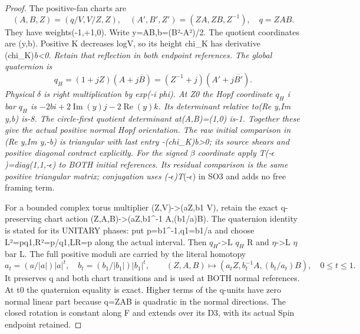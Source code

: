 \begin{proof}
The positive-fan charts are
\[
(A,B,Z)=(q/V,V/Z,Z),\quad(A',B',Z')=(ZA,ZB,Z^{-1}),\quad q=ZAB.
\]
They have weights(-1,+1,0). Write y=AB,b=(\textbar B\textbar²-\textbar A\textbar²)/2. The
quotient coordinates are (y,b). Positive K decreases log\textbar V\textbar, so its
height chi\_K has derivative (chi\_K)\emph{b\textless0. Retain that reflection in
both endpoint references. The global quaternion is
\[
q_H=(1+jZ)(A+j\overline B)=(Z^{-1}+j)(A'+j\overline {B'}).
\tag{RP.14}
\]
Physical \(\delta\) is right multiplication by exp(-i phi). At Z0 the
Hopf coordinate \(q_H\) i bar \(q_H\) is
\(-2b i+2\operatorname{Im}(y)j-2\operatorname{Re}(y)k\).
Its determinant relative to(Re y,Im y,b) is-8. The circle-first
quotient determinant at(A,B)=(1,0) is-1. Together these give the
actual positive normal Hopf orientation. The raw initial comparison
in (Re y,Im y,-b) is triangular with last entry -(chi\_K)\emph{b\textgreater0;
its source shears and positive diagonal contract explicitly.
For the signed \(\beta\) coordinate apply T}(-\(\epsilon\))=diag(1,1,-\(\epsilon\))
to BOTH initial references. Its residual comparison is the same
positive triangular matrix; conjugation uses (-\(\epsilon\))T}(-\(\epsilon\))
in SO3 and adds no free framing term.

For a bounded complex torus multiplier (Z,V)-\textgreater(aZ,b1 V), retain
the exact q-preserving chart action (Z,A,B)-\textgreater(aZ,b1\^{}-1 A,(b1/a)B).
The quaternion identity is stated for its UNITARY phases: put
p=b1\^{}-1,q1=b1/a and choose L²=pq1,R²=p/q1,LR=p along the actual
interval. Then \(q_H\)-\textgreater L \(q_H\) R and \(\eta\)-\textgreater L \(\eta\) bar L. The full positive
moduli are carried by the literal homotopy
\[
a_t=(a/|a|)|a|^t,\quad b_t=(b_1/|b_1|)|b_1|^t,\qquad
(Z,A,B)\mapsto(a_tZ,b_t^{-1}A,(b_t/a_t)B),\quad0\le t\le1.
\tag{RP.15}
\]
It preserves q and both chart transitions and is used at BOTH normal
references. At t0 the quaternion equality is exact. Higher terms of
the q-units have zero normal linear part because q=ZAB is quadratic
in the normal directions. The closed rotation is constant along F
and extends over its D3, with its actual Spin endpoint retained.


\end{proof}
